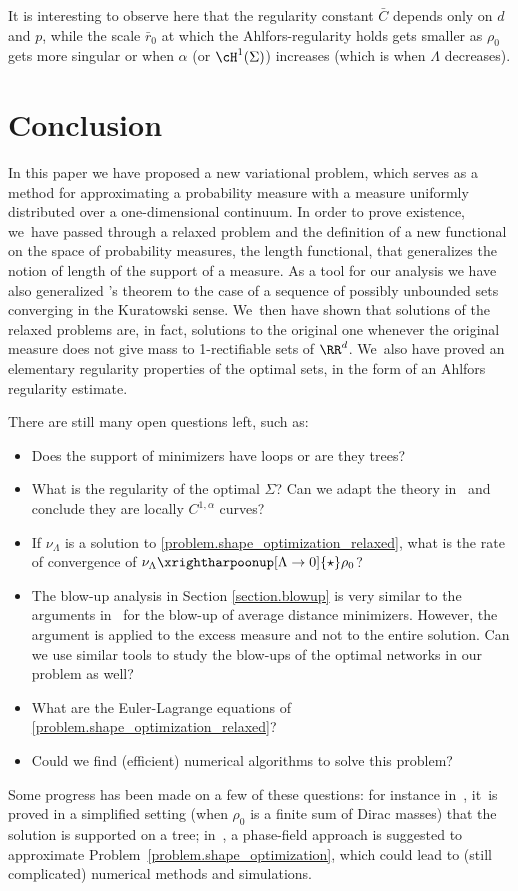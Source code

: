 \begin{remark} It is interesting to observe here that the regularity constant
$\bar C$ depends only on $d$ and $p$, while the scale $\bar r_0$ at which the Ahlfors-regularity
holds gets smaller as $\rho_0$ gets more singular or when $\alpha$ (or $\cH^1(\Sigma)$) increases (which is when $\Lambda$ decreases).
\end{remark}

\section{Conclusion}\label{section.conclusion}
In this paper we have proposed a new variational problem, which serves as a method for approximating a probability measure with a measure uniformly distributed over a one-dimensional continuum.
In order to prove existence, we~have passed through a relaxed problem and the definition of a new functional on the space of probability measures, the length functional, that generalizes the notion of length of the support of a measure. As a tool for our analysis we have also generalized \Golab's theorem to the case of a sequence of possibly unbounded sets converging in the Kuratowski sense. We~then have shown that solutions of the relaxed
problems are, in fact, solutions to the original one whenever the original measure does not give mass to 1-rectifiable sets of $\RR^d$. We~also have proved an elementary regularity properties of the
optimal sets, in the form of an Ahlfors regularity estimate.

There are still many open questions left, such as:
\begin{itemize}
\item Does the support of minimizers have loops or are they trees?
\item What is the regularity of the optimal $\Sigma$? Can we adapt the theory in~\cite{morgan1994m} and conclude they are locally $C^{1,\alpha}$ curves?
\item If $\nu_\Lambda$ is a solution to \eqref{problem.shape_optimization_relaxed}, what is the rate of convergence of $\nu_\Lambda \xrightharpoonup[\Lambda \to 0]{\star} \rho_0$?
\item The blow-up analysis in Section \ref{section.blowup} is very similar to the arguments in~\cite{santambrogio2005blow} for the blow-up of average distance minimizers. However, the argument is applied to the excess measure and not to the entire solution. Can we use similar tools to study the blow-ups of the optimal networks in our problem as well?
\item What are the Euler-Lagrange equations of \eqref{problem.shape_optimization_relaxed}?
\item Could we find (efficient) numerical algorithms to solve this problem?
\end{itemize}
Some progress has been made on a few of these questions: for instance in~\cite{MachadoThesis},
it~is proved in a simplified setting (when $\rho_0$ is a finite sum
of Dirac masses) that the solution is supported on a tree; in~\cite{MachadoPhaseField},
a phase-field approach is suggested to approximate Problem~\eqref{problem.shape_optimization}, which could
lead to (still complicated) numerical methods and simulations.

